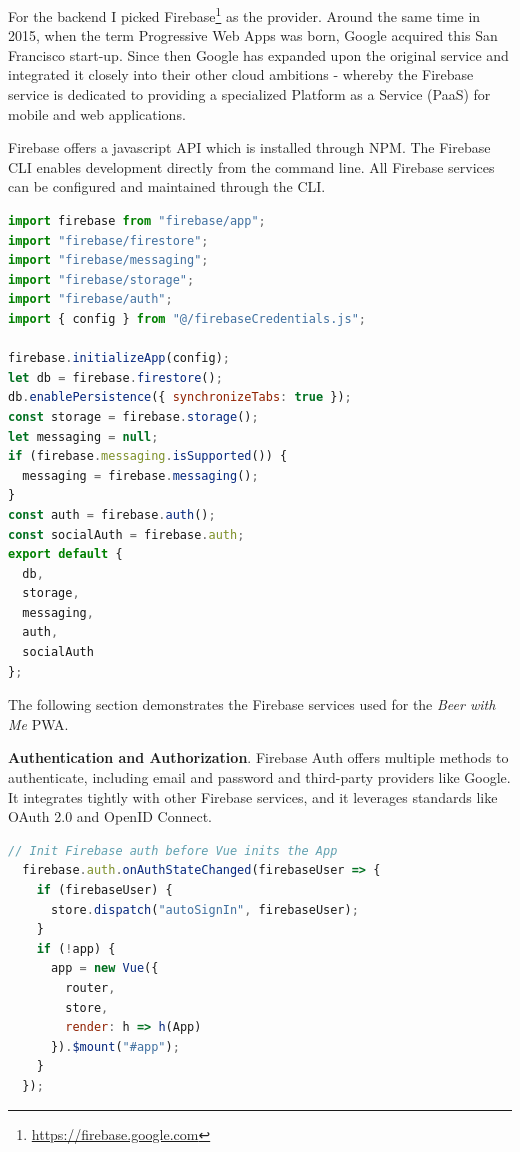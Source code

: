 For the backend I picked Firebase\footnote{\url{https://firebase.google.com}} as the provider. Around the same time in 2015, when the term Progressive Web Apps was born, Google acquired this San Francisco start-up. Since then Google has expanded upon the original service and integrated it closely into their other cloud ambitions - whereby the Firebase service is dedicated to providing a specialized Platform as a Service (PaaS) for mobile and web applications.

Firebase offers a javascript API which is installed through NPM. The Firebase CLI enables development directly from the command line. All Firebase services can be configured and maintained through the CLI.

\begin{lstlisting}[language=JavaScript, caption=Firebase configuration and services (firebaseConfig.js), label=lst:firebase-conf]
import firebase from "firebase/app";
import "firebase/firestore";
import "firebase/messaging";
import "firebase/storage";
import "firebase/auth";
import { config } from "@/firebaseCredentials.js";

firebase.initializeApp(config);
let db = firebase.firestore();
db.enablePersistence({ synchronizeTabs: true });
const storage = firebase.storage();
let messaging = null;
if (firebase.messaging.isSupported()) {
  messaging = firebase.messaging();
}
const auth = firebase.auth();
const socialAuth = firebase.auth;
export default {
  db,
  storage,
  messaging,
  auth,
  socialAuth
};
\end{lstlisting}


The following section demonstrates the Firebase services used for the \textit{Beer with Me} PWA.

\textbf{Authentication and Authorization}. Firebase Auth offers multiple methods to authenticate, including email and password and third-party providers like Google. It integrates tightly with other Firebase services, and it leverages standards like OAuth 2.0 and OpenID Connect.

\begin{lstlisting}[language=JavaScript, caption=Firebase Auth initiation using VueJS (main.js), label=lst:firebase-auth]
  // Init Firebase auth before Vue inits the App
  firebase.auth.onAuthStateChanged(firebaseUser => {
    if (firebaseUser) {
      store.dispatch("autoSignIn", firebaseUser);
    }
    if (!app) {
      app = new Vue({
        router,
        store,
        render: h => h(App)
      }).$mount("#app");
    }
  });
\end{lstlisting}

